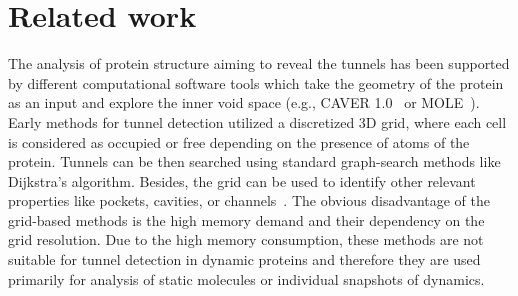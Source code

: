 \documentclass{svmult}
\begin{document}


\section{Related work}


The analysis of protein structure aiming to reveal the tunnels has been supported by different computational software tools which take the geometry of the protein as an input and explore the inner void space (e.g., CAVER 1.0~\cite{petrek2006caver} or MOLE~\cite{Petrek20071357}). 
Early methods for tunnel detection utilized a discretized 3D grid, where each cell is considered as occupied or free depending
on the presence of atoms of the protein.
Tunnels can be then searched using standard graph-search methods like Dijkstra's algorithm.
Besides, the grid can be used to identify other relevant properties like 
pockets, cavities, or channels~\cite{sehnal2013mole,petrek2006caver}.
The obvious disadvantage of the grid-based methods is the high memory demand and their dependency on the grid resolution.
Due to the high memory consumption, these methods are not suitable for tunnel detection in dynamic proteins and therefore they
are used primarily for analysis of static molecules or individual snapshots of dynamics.
\end{document}
